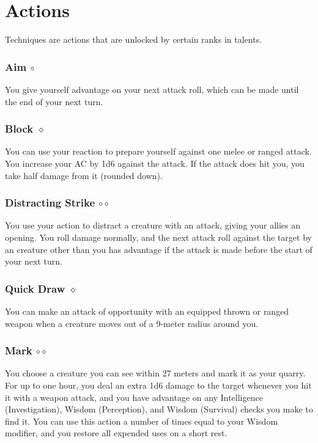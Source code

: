 \section{Actions}
Techniques are actions that are unlocked by certain ranks in talents. %




\subsubsection{Aim $\circ$} \label{act::aim}
    You give yourself advantage on your next attack roll, which can be made until the end of your next turn.

\subsubsection{Block $\diamond$} \label{act::block}
    You can use your reaction to prepare yourself against one melee or ranged attack.
    You increase your AC by 1d6 against the attack.
    If the attack does hit you, you take half damage from it (rounded down).

\subsubsection{Distracting Strike $\circ\circ$} \label{act::distractingstrike}
    You use your action to distract a creature with an attack, giving your allies an opening.
    You roll damage normally, and the next attack roll against the target by an creature other than you has advantage if the attack is made before the start of your next turn.

\subsubsection{Quick Draw $\diamond$} \label{act::quickdraw}
    You can make an attack of opportunity with an equipped thrown or ranged weapon when a creature moves out of a 9-meter radius around you.

\subsubsection{Mark $\circ\circ$} \label{act::mark}
    You choose a creature you can see within 27 meters and mark it as your quarry.
    For up to one hour, you deal an extra 1d6 damage to the target whenever you hit it with a weapon attack, and you have advantage on any Intelligence (Investigation), Wisdom (Perception), and Wisdom (Survival) checks you make to find it.
    You can use this action a number of times equal to your Wisdom modifier, and you restore all expended uses on a short rest.

